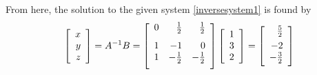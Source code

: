 \begin{solution}
From here, the solution to the given system \ref{inversesystem1} is
found by
\begin{equation*}
\leftB
\begin{array}{r}
x \\
y \\
z
\end{array}
\rightB = A^{-1}B = \leftB
\begin{array}{rrr}
0 & \vspace{0.05in}\frac{1}{2} & \vspace{0.05in}\frac{1}{2} \\
1 & -1 & 0 \\
1 & -\vspace{0.05in}\frac{1}{2} & -\vspace{0.05in}\frac{1}{2}
\end{array}
\rightB \leftB
\begin{array}{r}
1 \\
3 \\
2
\end{array}
\rightB =\leftB
\begin{array}{r}
\vspace{0.05in}\frac{5}{2} \\
-2 \\
-\vspace{0.05in}\frac{3}{2}
\end{array}
\rightB 
\end{equation*}
\end{solution}

